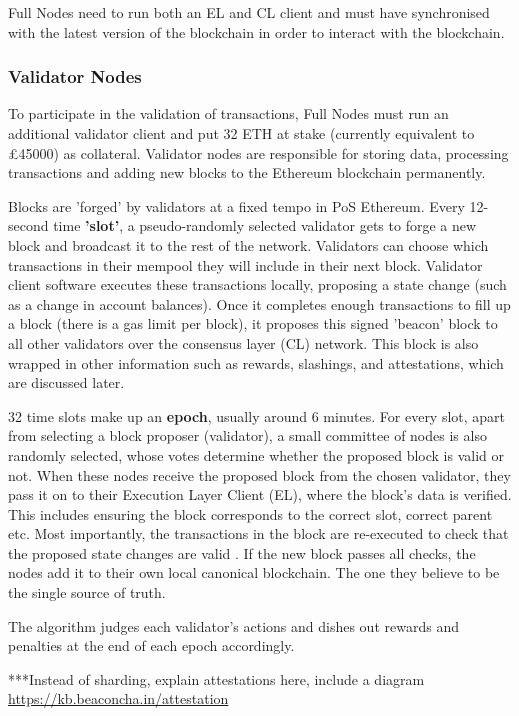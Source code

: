 Full Nodes need to run both an EL and CL client and must have  synchronised with the latest version of the blockchain in order to interact with the blockchain. 

\subsubsection{Validator Nodes}
To participate in the validation of transactions, Full Nodes must run an additional validator client and put 32 ETH at stake (currently equivalent to £45000) as collateral. Validator nodes are responsible for storing data, processing transactions and adding new blocks to the Ethereum blockchain permanently. 

Blocks are 'forged' by validators at a fixed tempo in PoS Ethereum. Every 12-second time \textbf{'slot'}, a pseudo-randomly selected validator gets to forge a new block and broadcast it to the rest of the network. Validators can choose which transactions in their mempool they will include in their next block. Validator client software executes these transactions locally, proposing a state change (such as a change in account balances). Once it completes enough transactions to fill up a block (there is a gas limit per block), it proposes this signed 'beacon' block to all other validators over the consensus layer (CL) network. This block is also wrapped in other information such as rewards, slashings, and attestations, which are discussed later.

32 time slots make up an \textbf{epoch}, usually around 6 minutes. For every slot, apart from selecting a block proposer (validator), a small committee of nodes is also randomly selected, whose votes determine whether the proposed block is valid or not. When these nodes receive the proposed block from the chosen validator, they pass it on to their Execution Layer Client (EL), where the block's data is verified. This includes ensuring the block corresponds to the correct slot, correct parent etc. Most importantly, the transactions in the block are re-executed to check that the proposed state changes are valid \cite{EthereumEthereum.org}. If the new block passes all checks, the nodes add it to their own local canonical blockchain. The one they believe to be the single source of truth. 

The algorithm judges each validator's actions and dishes out rewards and penalties at the end of each epoch accordingly. 

***Instead of sharding, explain attestations here, include a diagram \url{https://kb.beaconcha.in/attestation}

